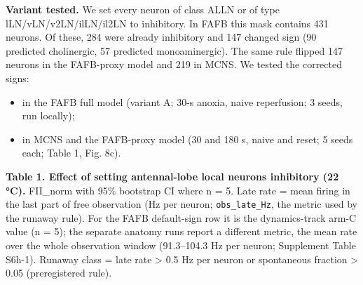 \documentclass[11pt]{article}
\providecommand{\tightlist}{\setlength{\itemsep}{0pt}\setlength{\parskip}{0pt}}
\begin{document}
\textbf{Variant tested.} We set every neuron of class ALLN or of type lLN/vLN/v2LN/ilLN/il2LN to inhibitory. In FAFB this mask contains 431 neurons. Of these, 284 were already inhibitory and 147 changed sign (90 predicted cholinergic, 57 predicted monoaminergic). The same rule flipped 147 neurons in the FAFB-proxy model and 219 in MCNS. We tested the corrected signs:

\begin{itemize}
\tightlist
\item
  in the FAFB full model (variant A; 30-s anoxia, naive reperfusion; 3 seeds, run locally);
\item
  in MCNS and the FAFB-proxy model (30 and 180 s, naive and reset; 5 seeds each; Table 1, Fig. 8c).
\end{itemize}

\textbf{Table 1. Effect of setting antennal-lobe local neurons inhibitory (22 °C).} FII\_norm with 95\% bootstrap CI where n = 5. Late rate = mean firing in the last part of free observation (Hz per neuron; \texttt{obs\_late\_Hz}, the metric used by the runaway rule). For the FAFB default-sign row it is the dynamics-track arm-C value (n = 5); the separate anatomy runs report a different metric, the mean rate over the whole observation window (91.3--104.3 Hz per neuron; Supplement Table S6h-1). Runaway class = late rate \textgreater{} 0.5 Hz per neuron or spontaneous fraction \textgreater{} 0.05 (preregistered rule).
\end{document}
